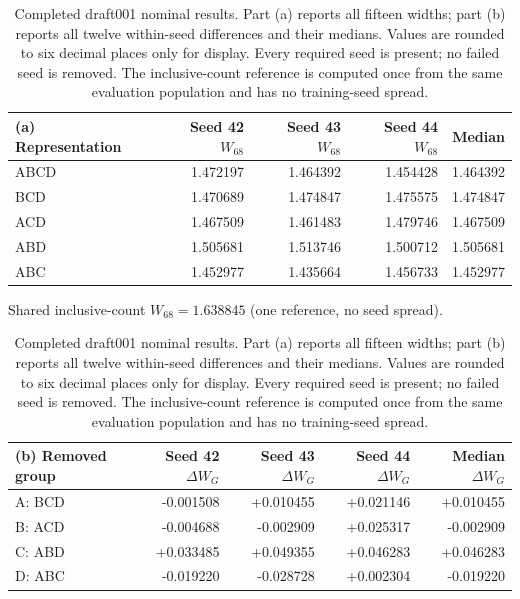 \begin{table}[tbp]
\caption{Completed draft001 nominal results. Part (a) reports all fifteen
widths; part (b) reports all twelve within-seed differences and their medians.
Values are rounded to six decimal places only for display. Every required seed
is present; no failed seed is removed. The inclusive-count reference is computed
once from the same evaluation population and has no training-seed spread.}
\label{tab:nominal}
\centering
\begin{tabular}{lrrrr}\toprule
(a) Representation & Seed 42 $W_{68}$ & Seed 43 $W_{68}$ & Seed 44 $W_{68}$ & Median \\\midrule
ABCD & 1.472197 & 1.464392 & 1.454428 & 1.464392 \\
BCD & 1.470689 & 1.474847 & 1.475575 & 1.474847 \\
ACD & 1.467509 & 1.461483 & 1.479746 & 1.467509 \\
ABD & 1.505681 & 1.513746 & 1.500712 & 1.505681 \\
ABC & 1.452977 & 1.435664 & 1.456733 & 1.452977 \\
\bottomrule\end{tabular}
\par\medskip
Shared inclusive-count $W_{68}=1.638845$ (one reference, no seed spread).\par\medskip
\centering
\begin{tabular}{lrrrr}\toprule
(b) Removed group & Seed 42 $\Delta W_G$ & Seed 43 $\Delta W_G$ & Seed 44 $\Delta W_G$ & Median $\Delta W_G$ \\\midrule
A: BCD & -0.001508 & +0.010455 & +0.021146 & +0.010455 \\
B: ACD & -0.004688 & -0.002909 & +0.025317 & -0.002909 \\
C: ABD & +0.033485 & +0.049355 & +0.046283 & +0.046283 \\
D: ABC & -0.019220 & -0.028728 & +0.002304 & -0.019220 \\
\bottomrule\end{tabular}
\par\medskip
\end{table}
